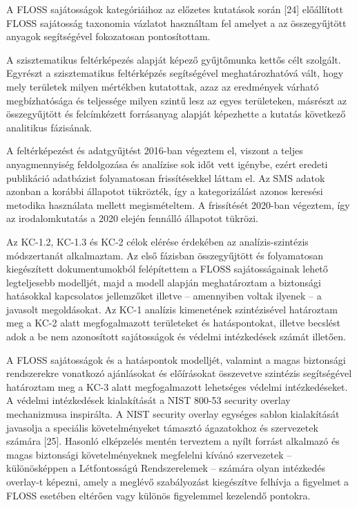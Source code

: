 \documentclass[12pt,magyar,a4paper,oneside]{scrreprt}
\begin{document}
A FLOSS sajátosságok kategóriáihoz az előzetes kutatások során {[}24{]}
előállított FLOSS sajátosság taxonomia vázlatot használtam fel amelyet a
az összegyűjtött anyagok segítségével fokozatosan pontosítottam.

A szisztematikus feltérképezés alapját képező gyűjtőmunka kettős célt
szolgált. Egyrészt a szisztematikus feltérképzés segítségével
meghatározhatóvá vált, hogy mely területek milyen mértékben kutatottak,
azaz az eredmények várható megbízhatósága és teljessége milyen szintű
lesz az egyes területeken, másrészt az összegyűjtött és felcímkézett
forrásanyag alapját képezhette a kutatás következő analitikus fázisának.

A feltérképezést és adatgyűjtést 2016-ban végeztem el, viszont a teljes
anyagmennyiség feldolgozása és analízise sok időt vett igénybe, ezért
eredeti publikáció adatbázist folyamatosan frissítésekkel láttam el. Az
SMS adatok azonban a korábbi állapotot tükrözték, így a kategorizálást
azonos keresési metodika használata mellett megismételtem. A frissítését
2020-ban végeztem, így az irodalomkutatás a 2020 elején fennálló
állapotot tükrözi.

Az KC-1.2, KC-1.3 és KC-2 célok elérése érdekében az analízis-szintézis
módszertanát alkalmaztam. Az első fázisban összegyűjtött és folyamatosan
kiegészített dokumentumokból felépítettem a FLOSS sajátosságainak lehető
legteljesebb modelljét, majd a modell alapján meghatároztam a biztonsági
hatásokkal kapcsolatos jellemzőket illetve -- amennyiben voltak ilyenek
-- a javasolt megoldásokat. Az KC-1 analízis kimenetének szintézisével
határoztam meg a KC-2 alatt megfogalmazott területeket és hatáspontokat,
illetve becslést adok a be nem azonosított sajátosságok és védelmi
intézkedések számát illetően.

A FLOSS sajátosságok és a hatáspontok modelljét, valamint a magas
biztonsági rendszerekre vonatkozó ajánlásokat és előírásokat összevetve
szintézis segítségével határoztam meg a KC-3 alatt megfogalmazott
lehetséges védelmi intézkedéseket. A védelmi intézkedések kialakítását a
NIST 800-53 security overlay mechanizmusa inspirálta. A NIST security
overlay egységes sablon kialakítását javasolja a speciális
követelményeket támasztó ágazatokhoz és szervezetek számára {[}25{]}.
Hasonló elképzelés mentén terveztem a nyílt forrást alkalmazó és magas
biztonsági követelményeknek megfelelni kívánó szervezetek --
különösképpen a Létfontosságú Rendszerelemek -- számára olyan intézkedés
overlay-t képezni, amely a meglévő szabályozást kiegészítve felhívja a
figyelmet a FLOSS esetében eltérően vagy különös figyelemmel kezelendő
pontokra.
\end{document}
